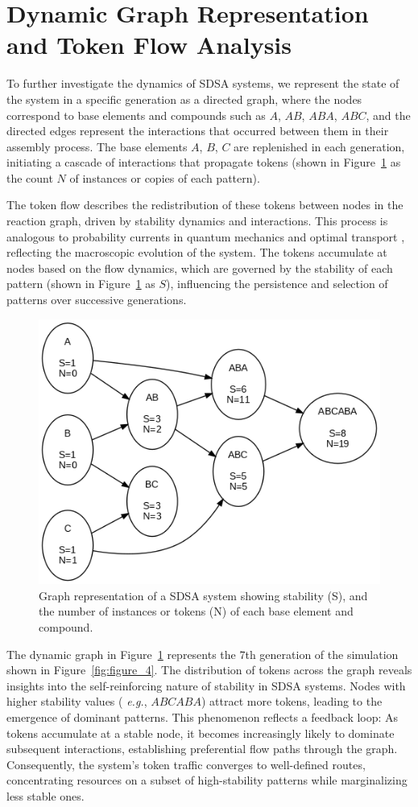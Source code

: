 \documentclass[preprint,12pt]{elsarticle}
\begin{document}
\section{Dynamic Graph Representation and Token Flow Analysis}

To further investigate the dynamics of SDSA systems, we represent the state of the system in a specific generation as a directed graph, where the nodes correspond to base elements and compounds such as $A$, $AB$, $ABA$, $ABC$, and the directed edges represent the interactions that occurred between them in their assembly process. The base elements $A$, $B$, $C$ are replenished in each generation, initiating a cascade of interactions that propagate tokens (shown in Figure~\ref{fig:figure_5} as the count $N$ of instances or copies of each pattern). 

The token flow describes the redistribution of these tokens between nodes in the reaction graph, driven by stability dynamics and interactions. This process is analogous to probability currents in quantum mechanics \cite{feynman1965quantum} and optimal transport \cite{villani2008optimal}, reflecting the macroscopic evolution of the system. The tokens accumulate at nodes based on the flow dynamics, which are governed by the stability of each pattern (shown in Figure~\ref{fig:figure_5} as $S$), influencing the persistence and selection of patterns over successive generations.


\begin{figure}[h]
    \centering
    \includegraphics[width=0.7\linewidth]{figure_5.png}
    \caption{Graph representation of a SDSA system showing stability (S), and the number of instances or tokens (N) of each base element and compound.}
    \label{fig:figure_5}
\end{figure}

The dynamic graph in Figure~\ref{fig:figure_5} represents the 7th generation of the simulation shown in Figure~\ref{fig:figure_4}. The distribution of tokens across the graph reveals insights into the self-reinforcing nature of stability in SDSA systems. Nodes with higher stability values (\textit{ e.g.}, $ABCABA$) attract more tokens, leading to the emergence of dominant patterns. This phenomenon reflects a feedback loop: As tokens accumulate at a stable node, it becomes increasingly likely to dominate subsequent interactions, establishing preferential flow paths through the graph. Consequently, the system's token traffic converges to well-defined routes, concentrating resources on a subset of high-stability patterns while marginalizing less stable ones.
\end{document}
